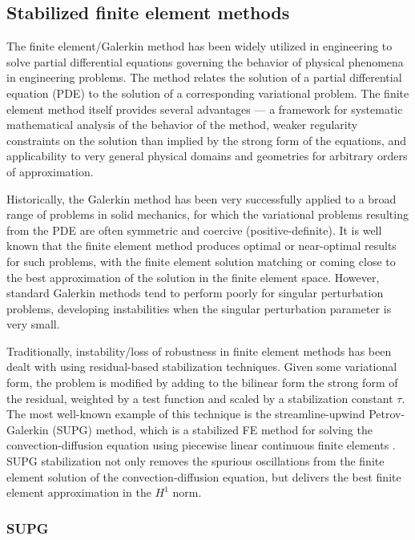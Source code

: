\subsection{Stabilized finite element methods}

The finite element/Galerkin method has been widely utilized in engineering to solve partial differential equations governing the behavior of physical phenomena in engineering problems.  The method relates the solution of a partial differential equation (PDE) to the solution of a corresponding variational problem. The finite element method itself provides several advantages --- a framework for systematic mathematical analysis of the behavior of the method, weaker regularity constraints on the solution than implied by the strong form of the equations, and applicability to very general physical domains and geometries for arbitrary orders of approximation. 

Historically, the Galerkin method has been very successfully applied to a broad range of problems in solid mechanics, for which the variational problems resulting from the PDE are often symmetric and coercive (positive-definite). It is well known that the finite element method produces optimal or near-optimal results for such problems, with the finite element solution matching or coming close to the best approximation of the solution in the finite element space. However, standard Galerkin methods tend to perform poorly for singular perturbation problems, developing instabilities when the singular perturbation parameter is very small. 

Traditionally, instability/loss of robustness in finite element methods has been dealt with using residual-based stabilization techniques.  Given some variational form, the problem is modified by adding to the bilinear form the strong form of the residual, weighted by a test function and scaled by a stabilization constant $\tau$.  The most well-known example of this technique is the streamline-upwind Petrov-Galerkin (SUPG) method, which is a stabilized FE method for solving the convection-diffusion equation using piecewise linear continuous finite elements \cite{SUPG}.  SUPG stabilization not only removes the spurious oscillations from the finite element solution of the convection-diffusion equation, but delivers the best finite element approximation in the $H^1$ norm.  

\subsubsection{SUPG}


